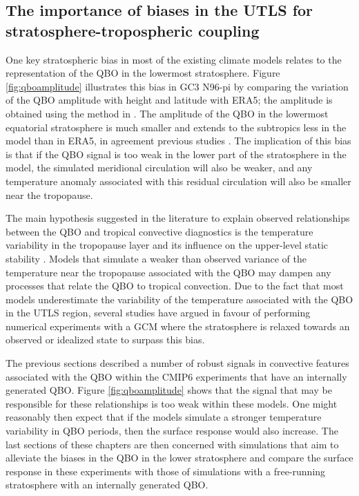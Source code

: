 \subsection{The importance of biases in the UTLS for stratosphere-tropospheric coupling}

One key stratospheric bias in most of the existing climate models relates to the representation of the QBO in the lowermost stratosphere. Figure \ref{fig:qboamplitude} illustrates this bias in GC3 N96-pi by comparing the variation of the QBO amplitude  with height and latitude with ERA5; the amplitude is obtained using the method in \cite{schenzinger2017}. The amplitude of the QBO in the lowermost equatorial stratosphere is much smaller and extends to the subtropics less in the model than in ERA5, in agreement previous studies \citep{schenzinger2017,richter2020,bushell2020}. The implication of this bias is that if the QBO signal is too weak in the lower part of the stratosphere in the model, the simulated meridional circulation will also be weaker, and any temperature anomaly associated with this residual circulation will also be smaller near the tropopause. 

The main hypothesis suggested in the literature to explain observed relationships between the QBO and tropical convective diagnostics is the temperature variability in the tropopause layer and its influence on the upper-level static stability \citep[][]{collimore2003,liess2012,nie2015,gray2018}.
Models that simulate a weaker than observed variance of the temperature near the tropopause associated with the QBO may dampen any processes that relate the QBO to tropical convection.
Due to the fact that most models underestimate the variability of the temperature associated with the QBO in the UTLS region, several studies have argued in favour of performing numerical experiments with a GCM where the stratosphere is relaxed towards an observed or idealized state \citep[e.g.][]{lee2018,martin2021} to surpass this bias. 

The previous sections described a number of robust signals in convective features associated with the QBO within the CMIP6 experiments that have an internally generated QBO. 
Figure \ref{fig:qboamplitude} shows that the signal that may be responsible for these relationships is too weak within these models. 
One might reasonably then expect that if the models simulate a stronger temperature variability in QBO periods, then the surface response would also increase. 
The last sections of these chapters are then concerned with simulations that aim to alleviate the biases in the QBO in the lower stratosphere and compare the surface response in these experiments with those of simulations with a free-running stratosphere with an internally generated QBO.

